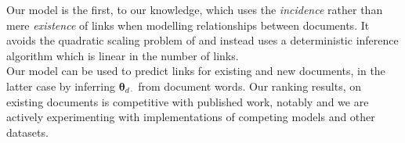 \documentclass{sciposter}
\newcommand \vv[1] { \bm #1 }
\newcommand \thdo { { \vv{\theta}_{d\cdot} } }
\begin{document}
\begin{multicols}{3}
Our model is the first, to our knowledge, which uses the \emph{incidence} rather than mere \emph{existence} of links when modelling relationships between documents. It avoids the quadratic scaling problem of \cite{Chang2009a} and instead uses a deterministic inference algorithm which is linear in the number of links.\\

Our model can be used to predict links for existing and new documents, in the latter case by inferring $\thdo$ from document words. Our ranking results, on existing documents is competitive with published work, notably \cite{Chang2009a}\cite{Neiswanger2014} and we are actively experimenting with implementations of competing models and other datasets.

 






\end{multicols}
\end{document}
